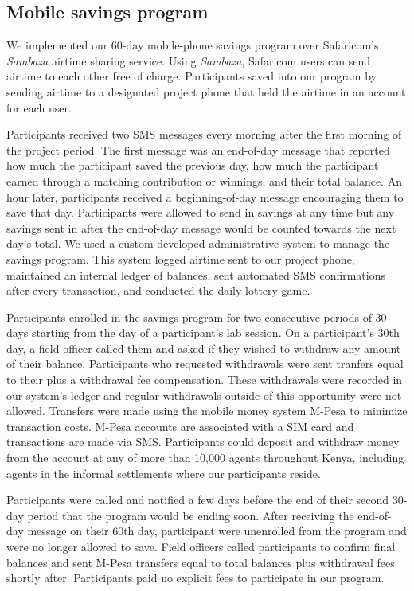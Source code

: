 \documentclass[12pt]{article}
\begin{document}
	\subsection{Mobile savings program}

		We implemented our 60-day mobile-phone savings program over Safaricom's \textit{Sambaza} airtime sharing service. Using \textit{Sambaza}, Safaricom users can send airtime to each other free of charge. Participants saved into our program by sending airtime to a designated project phone that held the airtime in an account for each user.

		Participants received two SMS messages every morning after the first morning of the project period. The first message was an end-of-day message that reported how much the participant saved the previous day, how much the participant earned through a matching contribution or winnings, and their total balance. An hour later, participants received a beginning-of-day message encouraging them to save that day. Participants were allowed to send in savings at any time but any savings sent in after the end-of-day message would be counted towards the next day's total. We used a custom-developed administrative system to manage the savings program. This system logged airtime sent to our project phone, maintained an internal ledger of balances, sent automated SMS confirmations after every transaction, and conducted the daily lottery game.

		Participants enrolled in the savings program for two consecutive periods of 30 days starting from the day of a participant's lab session. On a participant's 30th day, a field officer called them and asked if they wished to withdraw any amount of their balance. Participants who requested withdrawals were sent tranfers equal to their plus a withdrawal fee compensation. These withdrawals were recorded in our system's ledger and regular withdrawals outside of this opportunity were not allowed. Transfers were made using the mobile money system M-Pesa to minimize transaction costs. M-Pesa accounts are associated with a SIM card and transactions are made via SMS. Participants could deposit and withdraw money from the account at any of more than 10,000 agents throughout Kenya, including agents in the informal settlements where our participants reside.

		Participants were called and notified a few days before the end of their second 30-day period that the program would be ending soon. After receiving the end-of-day message on their 60th day, participant were unenrolled from the program and were no longer allowed to save. Field officers called participants to confirm final balances and sent M-Pesa transfers equal to total balances plus withdrawal fees shortly after. Participants paid no explicit fees to participate in our program.
\end{document}
